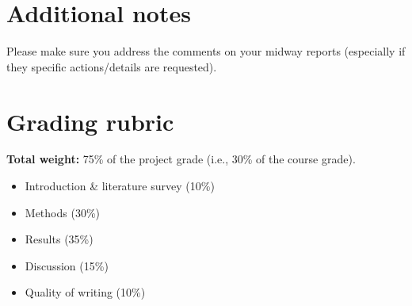 \documentclass{article}
\begin{document}
\section*{Additional notes}

Please make sure you address the comments on your midway reports (especially if they specific actions/details are requested).

\section*{Grading rubric}

\textbf{Total weight:} 75\% of the project grade (i.e., 30\% of the course grade).

\begin{itemize}[leftmargin=2em]
    \item Introduction \& literature survey (10\%)
    \item Methods (30\%)
    \item Results (35\%)
    \item Discussion (15\%)
    \item Quality of writing (10\%)
\end{itemize}

\end{document}
